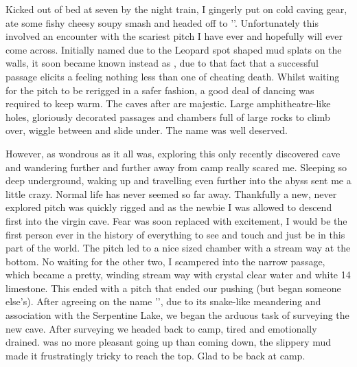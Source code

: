 Kicked out of bed at seven by the night train, I gingerly put on cold caving gear, ate some fishy
cheesy soupy smash and headed off to ''. Unfortunately this involved an encounter with
the scariest pitch I have ever and hopefully will ever come across. Initially named  due to the
Leopard spot shaped mud splats on the walls, it soon became known instead as , due to that
fact that a successful passage elicits a feeling nothing less than one of cheating death. Whilst waiting
for the pitch to be rerigged in a safer fashion, a good deal of dancing was required to keep warm. The
caves after  are majestic. Large amphitheatre-like holes, gloriously decorated passages and
chambers full of large rocks to climb over, wiggle between and slide under. The name  was
well deserved.


However, as wondrous as it all was, exploring this only recently discovered cave and wandering
further and further away from camp really scared me. Sleeping so deep underground, waking up and
travelling even further into the abyss sent me a little crazy. Normal life has never seemed so far away.
Thankfully a new, never explored pitch was quickly rigged and as the newbie I was allowed to descend
first into the virgin cave. Fear was soon replaced with excitement, I would be the first person ever in
the history of everything to see and touch and just be in this part of the world. The pitch led to a
nice sized chamber with a stream way at the bottom. No waiting for the other two, I scampered into
the narrow passage, which became a pretty, winding stream way with crystal clear water and white
14
limestone. This ended with a pitch that ended our pushing (but began someone else's). After agreeing
on the name '', due to its snake-like meandering and association with the Serpentine Lake,
we began the arduous task of surveying the new cave. After surveying we headed back to camp, tired
and emotionally drained.  was no more pleasant going up than coming down, the slippery
mud made it frustratingly tricky to reach the top. Glad to be back at camp.

